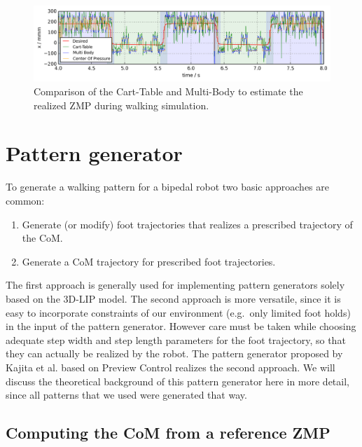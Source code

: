 \documentclass[english,ngerman]{KITreprt}
\begin{document}
\begin{figure}[tb]
\includegraphics[width=\textwidth,resolution=300]{images/zmp_comparison.png}
\caption{Comparison of the Cart-Table and Multi-Body to estimate the realized ZMP during walking simulation.}
\label{img:zmp-comparison}
\end{figure}

\chapter{Pattern generator}\label{chapter:pattern-generator}

To generate a walking pattern for a bipedal robot two basic approaches
are common:

\begin{enumerate}
\def\labelenumi{\arabic{enumi}.}
\item
  Generate (or modify) foot trajectories that realizes a prescribed
  trajectory of the CoM.
\item
  Generate a CoM trajectory for prescribed foot trajectories.
\end{enumerate}

The first approach is generally used for implementing pattern generators
solely based on the 3D-LIP model. \cite{kajita20013d} The second
approach is more versatile, since it is easy to incorporate constraints
of our environment (e.g.~only limited foot holds) in the input of the
pattern generator. However care must be taken while choosing adequate
step width and step length parameters for the foot trajectory, so that
they can actually be realized by the robot. The pattern generator
proposed by Kajita et al. \cite{kajita2003biped} based on Preview
Control realizes the second approach. We will discuss the theoretical
background of this pattern generator here in more detail, since all
patterns that we used were generated that way.

\section{Computing the CoM from a reference
ZMP}\label{computing-the-com-from-a-reference-zmp}
\end{document}
